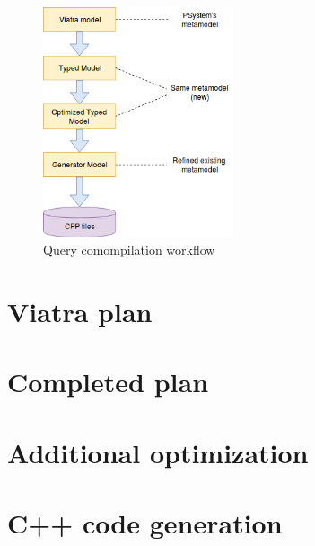 \begin{figure}[h]
	\begin{center}
		\includegraphics[width=0.5\textwidth]{figures/workflow.png}
		\caption{Query comompilation workflow}
		\label{figure:query-compile-workflow}
	\end{center}
\end{figure}


\section{Viatra plan}


\section{Completed plan}


\section{Additional optimization}


\section{C++ code generation}


